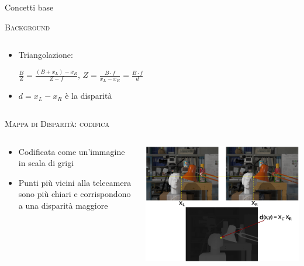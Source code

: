 \documentclass{beamer}
\begin{document}
\begin{section}{Concetti base}
\begin{frame}[t]{\textsc{Background}}
\begin{columns}
\begin{column}{5cm}
\begin{itemize}
\item \small{Triangolazione}:
\begin{center}
 $\frac{B}{Z} = \frac{(B+x_{L}) - x_{R}}{Z-f}$,
$Z = \frac{B \cdot f}{x_{L} - x_{R}} = \frac{B \cdot f}{d}$
\end{center}
\item  $ d = x_{L} - x_{R} $ \`{e} la disparit\`{a} 
\end{itemize}
\end{column}
\end{columns}
\end{frame}




\begin{frame}[t]{\textsc{Mappa di Disparit\`{a}: codifica}}
\begin{columns}
\hspace*{-4em}
\begin{column}{5cm}
\vspace{1em}
\begin{itemize}
\item  Codificata come un'immagine in scala di grigi
\item  Punti pi\`{u} vicini alla telecamera sono pi\`{u} chiari e corrispondono a una disparit\`{a} maggiore 
\end{itemize}
\end{column}
\hspace*{-3em}
\begin{column}{5.5cm}
\vspace{2em}
\centering
\includegraphics[width=1.2\linewidth]{./img/disparity.png}
\end{column}
\end{columns}
\end{frame}



\end{section}
\end{document}
